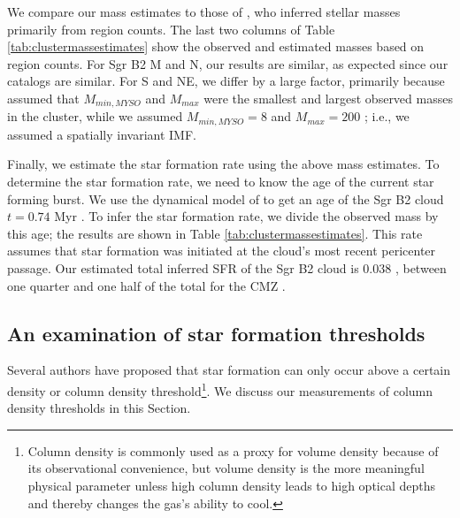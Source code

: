 \documentclass[twocolumn]{aastex61}
\begin{document}
We compare our mass estimates to those of \citet{Schmiedeke2016a}, who inferred
stellar masses primarily from \hii region counts.  The last two columns of Table
\ref{tab:clustermassestimates} show the observed and estimated masses based on
\hii region counts.  For Sgr B2 M and N, our results are similar, as expected
since our catalogs are similar.  For S and NE, we differ by a large factor,
primarily because \citet{Schmiedeke2016a} assumed that $M_{min,MYSO}$ and $M_{max}$
were the smallest and largest observed masses in the cluster, while we assumed
$M_{min,MYSO}=8$ \msun and $M_{max}=200$ \msun; i.e., we assumed a spatially
invariant IMF.



Finally, we estimate the star formation rate using the above mass estimates.
To determine the star formation rate, we need to know the age of the current
star forming burst.  We use the dynamical model of \citet{Kruijssen2015a} to
get an age of the Sgr B2 cloud $t=0.74$ Myr \citep{Longmore2013a}.  To infer
the star formation rate, we divide the observed mass by this age; the results
are shown in Table \ref{tab:clustermassestimates}.  This rate assumes that star
formation was initiated at the cloud's most recent pericenter passage.  Our
estimated total inferred SFR of the Sgr B2 cloud is 0.038 \msun \peryr, between
one quarter and one half of the total for the CMZ
\citep{Longmore2013a,Barnes2017b}.


% 

\subsection{An examination of star formation thresholds}
\label{sec:thresholds}
Several authors \citep[e.g.,][]{Lada2010a,Heiderman2010a} have proposed that star
formation can only occur above a certain density or column density
threshold\footnote{Column density is commonly used as a proxy for volume
density because of its observational convenience, but volume density is the
more meaningful physical parameter unless high column density leads to high
optical depths and thereby changes the gas's ability to cool.}. 
We discuss our measurements of column density thresholds in this Section.
\end{document}
